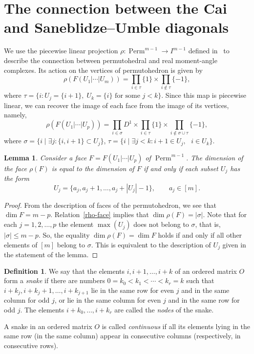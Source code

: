 \documentclass[a4paper,12pt]{amsart}
\renewcommand{\le}{\leqslant}
\newtheorem{lemma}[formula]{Lemma}
\theoremstyle{definition}
\newtheorem{definition}[formula]{Definition}
\theoremstyle{remark}
\numberwithin{equation}{section}
\DeclareMathOperator{\Perm}{Perm}
\begin{document}
\section{The connection between the Cai and Saneblidze--Umble diagonals}
We use the piecewise linear projection $\rho \colon \Perm^{m-1} \to I^{m-1}$ defined in~\cite{SU} to describe the connection between permutohedral and real moment-angle complexes.
Its action on the vertices of permutohedron is given by
$$\rho( F(U_1 | \cdots | U_m)) = \prod_{i \in \tau} \{ 1\} \times \prod_{i \notin \tau} \{-1\},$$
where $\tau = \{i \colon U_j=\{i+1\},\; U_k=\{i\} \text{ for some }j < k\}$.
Since this map is piecewise linear, we can recover the image of each face from the image of its vertices, namely,
\begin{equation}\label{rho-face}
\rho \left({F(U_1 | \cdots | U_p) }\right) = \prod_{i \in \sigma}D^1 \times \prod_{i \in \tau} \{ 1 \} \times \prod_{i \notin \sigma \cup \tau} \{-1\},
\end{equation}
where  $\sigma = \{i \mid \exists j : \{i, i+1 \} \subset U_j \}$, 
$\tau = \{i \mid \exists j < k:  i + 1 \in U_j, \text{ } i \in U_k\}.$

\begin{lemma}
Consider a face $F = F(U_1| \cdots | U_p)$ of $\Perm^{m-1}$.
The dimension of the face $\rho(F)$ is equal to the dimension of $F$ if and only if
each subset $U_j$ has the form
$$U_j = \{a_j, a_j+1, \ldots, a_j + |U_j| - 1 \}, \qquad a_j \in [m].$$
\end{lemma}
\begin{proof} 
From the description of faces of the permutohedron, we see that $\dim F = m - p$.
Relation~\eqref{rho-face} implies that $\dim \rho(F) = |\sigma|$.
Note that for each $j = 1, 2, \ldots, p$ the element $\max(U_j)$ does not belong to $\sigma$, that is, $|\sigma| \le  m-p$.
So, the equality $\dim \rho(F) = \dim F$ holds if and only if all other elements of $[m]$ belong to $\sigma$.
This is equivalent to the description of $U_j$ given in the statement of the lemma.
\end{proof}

\begin{definition}
We say that the elements $i, i+1, \ldots, i+k$ of an ordered matrix
$O$ form a \textit{snake} if there are numbers $0 = k_0 < k_1 <  \cdots < k_r = k$ such that $i + k_j, i+k_j + 1, \ldots, i+k_{j+1}$ lie in the same row for even $j$ and in the same column for odd $j$, or lie in the same column for even $j$ and in the same row for odd $j$.
The elements $i + k_0, \ldots, i + k_r$ are called the \textit{nodes} of the snake.

A snake in an ordered matrix $O$ is called \textit{continuous}
if all its elements lying in the same row (in the same column) appear in consecutive columns (respectively, in consecutive rows).
\end{definition}
\end{document}
